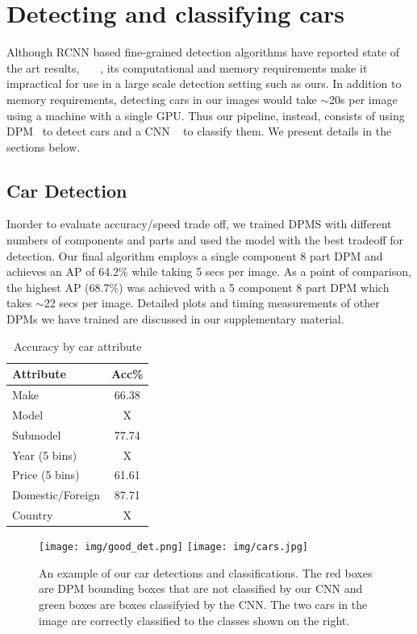 \documentclass[10pt,twocolumn,letterpaper]{article}
\begin{document}
\section{Detecting and classifying cars}
\label{sec:detection}
Although RCNN based fine-grained detection algorithms have reported state of the art results, ~\cite{rcnn}~\cite{ning}~\cite{branson}, its computational and memory requirements make it impractical for use in a large scale detection setting such as ours. In addition to memory requirements, detecting cars in our images would take \(\sim\)20s per image using a machine with a single GPU. Thus our pipeline, instead, consists of using DPM~\cite{dpm} to detect cars and a CNN ~\cite{alexnet} to classify them. We present details in the sections below.

\subsection{Car Detection}
Inorder to evaluate accuracy/speed trade off, we trained DPMS with different numbers of components and parts and used the model with the best tradeoff for detection. Our final algorithm employs a single component 8 part DPM and achieves an AP of 64.2\% while taking 5 secs per image. As a point of comparison, the highest AP (68.7\%) was achieved with a 5 component 8 part DPM which takes \(\sim\)22 secs per image. Detailed plots and timing measurements of other DPMs we have trained are discussed in our supplementary material.


\begin{table}
\begin{center}
\begin{tabular}{|l|c|}
\hline
\textbf{Attribute} & \textbf{Acc\%} \\
\hline\hline
Make & 66.38 \\
Model & X \\
Submodel & 77.74 \\
Year (5 bins) & X \\
Price (5 bins)& 61.61 \\
Domestic/Foreign & 87.71\\
Country & X\\
\hline
\end{tabular}
\end{center}
\caption{Accuracy by car attribute}
\label{table:tree-acc}
\end{table}

\begin{figure} [t]
\begin{center}
\texttt{[image: img/good\_det.png]}
\raisebox{-0.02\height}
 {
\texttt{[image: img/cars.jpg]}
 }
\end{center}
\caption {An example of our car detections and classifications. The red boxes are DPM bounding boxes that are not classified by our CNN and green boxes are boxes classifyied by the CNN. The two cars in the image are correctly classified to the classes shown on the right.}
\label{fig:dets}
\end{figure}
\end{document}
